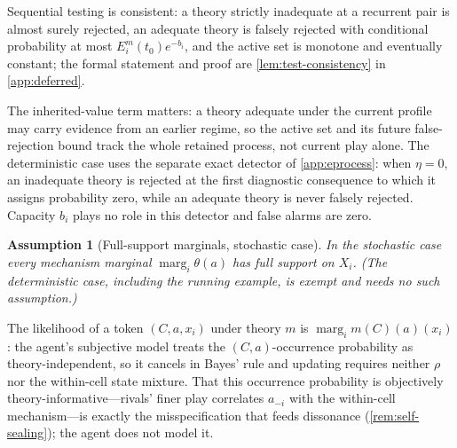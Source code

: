 \documentclass[11pt]{article}
\newtheorem{assumption}{Assumption}[section]
\theoremstyle{definition}
\newcommand{\marg}[1]{\operatorname{marg}_{#1}}
\begin{document}
Sequential testing is consistent: a theory strictly inadequate at a recurrent pair is almost surely rejected, an adequate theory is falsely rejected with conditional probability at most $E_i^m(t_0)e^{-b_i}$, and the active set is monotone and eventually constant; the formal statement and proof are \cref{lem:test-consistency} in \cref{app:deferred}.

The inherited-value term matters: a theory adequate under the current profile may carry evidence from an earlier regime, so the active set and its future false-rejection bound track the whole retained process, not current play alone.
The deterministic case uses the separate exact detector of \cref{app:eprocess}: when $\eta=0$, an inadequate theory is rejected at the first diagnostic consequence to which it assigns probability zero, while an adequate theory is never falsely rejected.
Capacity $b_i$ plays no role in this detector and false alarms are zero.

\begin{assumption}[Full-support marginals, stochastic case]
\label{ass:full-support}
In the stochastic case every mechanism marginal $\marg{i}\theta(a)$ has full support on $X_i$.
(The deterministic case, including the running example, is exempt and needs no such assumption.)
\end{assumption}

The likelihood of a token $(C,a,x_i)$ under theory $m$ is $\marg{i}m(C)(a)(x_i)$: the agent's subjective model treats the $(C,a)$-occurrence probability as theory-independent, so it cancels in Bayes' rule and updating requires neither $\rho$ nor the within-cell state mixture.
That this occurrence probability is objectively theory-informative---rivals' finer play correlates $a_{-i}$ with the within-cell mechanism---is exactly the misspecification that feeds dissonance (\cref{rem:self-sealing}); the agent does not model it.
\end{document}
